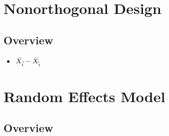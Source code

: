 \documentclass[11pt,fleqn]{book} %
\begin{document}





\chapter{Nonorthogonal Design}

\section{Overview}

\begin{itemize}
	\item $\bar{X_{i\dot\dot}} - \bar{X_{\dot\dot i}}$
\end{itemize}




\chapter{Random Effects Model}

\section{Overview}



\end{document}
